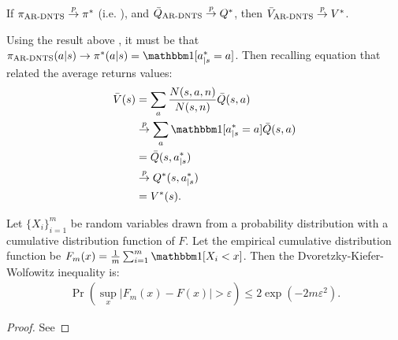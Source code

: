 
        \begin{lemma}
            If ${\pi_{{\textnormal{AR-DNTS}}}}\overset{p}{\to}\pi^*$ (i.e. ), and ${\bar{Q}_{{\textnormal{AR-DNTS}}}} \overset{p}{\to} Q^*$, then ${\bar{V}_{{\textnormal{AR-DNTS}}}} \overset{p}{\to} V^*$.
        \end{lemma}
        \begin{proofoutline}
            Using the result above , it must be that $\piardents(a|s) \rightarrow \pi^*(a|s) = \one[a^*_{|s} = a]$. Then recalling equation  that related the average returns values:
            \begin{align}
                \bar{V}(s) &= \sum_{a} \frac{N(s,a,n)}{N(s,n)} \bar{Q}(s,a) \\
                    &\rap \sum_{a} \one[a^*_{|s}=a] \bar{Q}(s,a) \\
                    &= \bar{Q}(s,a^*_{|s}) \\
                    &\rap Q^*(s,a^*_{|s}) \\
                    &= V^*(s).
            \end{align}
        \end{proofoutline}










        

        \begin{theorem} \label{thrm:dkw_inequality}
            Let $\{X_i\}_{i=1}^m$ be random variables drawn from a probability distribution with a cumulative distribution function of $F$. Let the empirical cumulative distribution function be $F_m(x)=\frac{1}{m} \sum_{i=1}^m \one[X_i < x]$. Then the Dvoretzky-Kiefer-Wolfowitz inequality is:
            \begin{align}
                \Pr\left(\sup_x |F_m(x)-F(x)| > \varepsilon\right) \leq 2\exp\left(-2m\varepsilon^2\right).
            \end{align}
        \end{theorem}
        \begin{proof}
            See %
        \end{proof}
        

